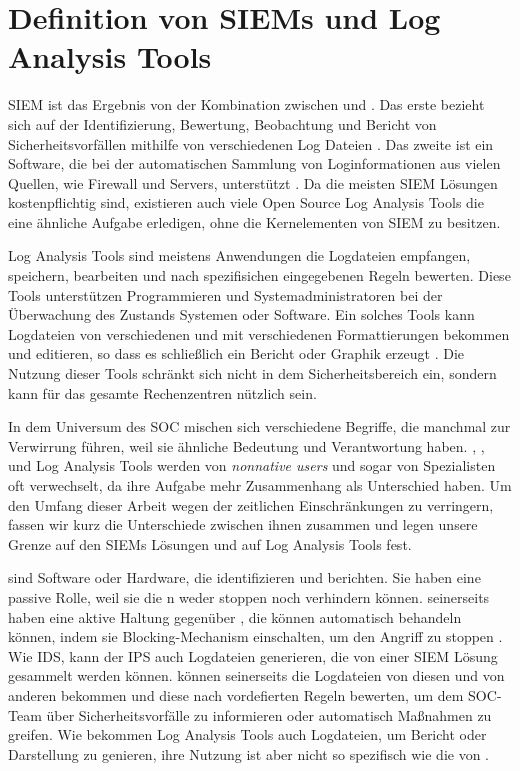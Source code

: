\section{Definition von SIEMs und Log Analysis Tools}

\gls{SIEM} ist das Ergebnis von der Kombination zwischen  und  \citep{Dorigo_SIEM}. Das erste bezieht sich auf der Identifizierung, Bewertung, Beobachtung und Bericht von Sicherheitsvorfällen mithilfe von verschiedenen Log Dateien \citep{techopedia_SEM}. Das zweite ist ein Software, die bei der automatischen Sammlung von Loginformationen aus vielen Quellen, wie Firewall und Servers, unterstützt \citep{techopedia_SIM}. Da die meisten \gls{SIEM} Lösungen kostenpflichtig sind, existieren auch viele \gls{Open Source} Log Analysis Tools die eine ähnliche Aufgabe erledigen, ohne die Kernelementen von \gls{SIEM} zu besitzen.

Log Analysis Tools sind meistens Anwendungen die Logdateien empfangen, speichern, bearbeiten und nach spezifisichen eingegebenen Regeln bewerten. Diese Tools unterstützen Programmieren und Systemadministratoren bei der Überwachung des Zustands Systemen oder Software. Ein solches Tools kann Logdateien von verschiedenen  und mit verschiedenen Formattierungen bekommen und editieren, so dass es schließlich ein Bericht oder Graphik erzeugt \citep{Korzeniowski_LATDef}. Die Nutzung dieser Tools schränkt sich nicht in dem Sicherheitsbereich ein, sondern kann für das gesamte Rechenzentren nützlich sein.

In dem Universum des \gls{SOC} mischen sich verschiedene Begriffe, die manchmal zur Verwirrung führen, weil sie ähnliche Bedeutung und Verantwortung haben. , ,  und Log Analysis Tools werden von \textit{nonnative users} und sogar von Spezialisten oft verwechselt, da ihre Aufgabe mehr Zusammenhang als Unterschied haben. Um den Umfang dieser Arbeit wegen der zeitlichen Einschränkungen zu verringern, fassen wir kurz die Unterschiede zwischen ihnen zusammen und legen unsere Grenze auf den \glspl{SIEM} Lösungen und auf Log Analysis Tools fest.

\newpage
{} sind Software oder Hardware, die  identifizieren und berichten. Sie haben eine passive Rolle, weil sie die n weder stoppen noch verhindern können.  seinerseits haben eine aktive Haltung gegenüber , die können automatisch behandeln können, indem sie Blocking-Mechanism einschalten, um den Angriff zu stoppen \citep{Wendzel_IS}. Wie \gls{IDS}, kann der \gls{IPS} auch Logdateien generieren, die von einer \gls{SIEM} Lösung gesammelt werden können.  können seinerseits die Logdateien von diesen und von anderen  bekommen und diese nach vordefierten Regeln bewerten, um dem \gls{SOC}-Team über Sicherheitsvorfälle zu informieren oder automatisch Maßnahmen zu greifen. Wie  bekommen Log Analysis Tools auch Logdateien, um Bericht oder Darstellung zu genieren, ihre Nutzung ist aber nicht so spezifisch wie die von .


